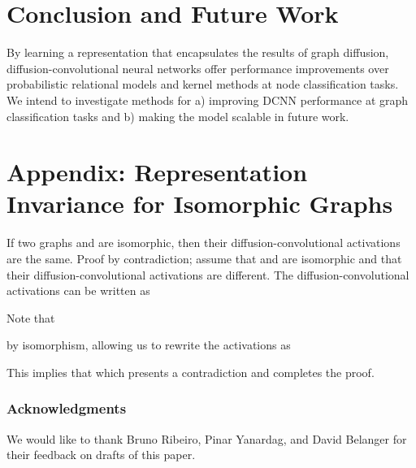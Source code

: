 \documentclass{article}
\begin{document}
\section{Conclusion and Future Work}
\label{sec:conclusion}
By learning a representation that encapsulates the results of graph diffusion, diffusion-convolutional neural networks offer performance improvements over probabilistic relational models and kernel methods at node classification tasks.  We intend to investigate methods for a) improving DCNN performance at graph classification tasks and b) making the model scalable in future work.


\section{Appendix: Representation Invariance for Isomorphic Graphs}
\label{sec:appendix}
If two graphs  and  are isomorphic, then their diffusion-convolutional activations are the same.  Proof by contradiction; assume that  and  are isomorphic and that their diffusion-convolutional activations are different.  The diffusion-convolutional activations can be written as

Note that

by isomorphism, allowing us to rewrite the activations as

This implies that  which presents a contradiction and completes the proof.

\subsubsection*{Acknowledgments}
We would like to thank Bruno Ribeiro, Pinar Yanardag, and David Belanger for their feedback on drafts of this paper.  



\end{document}
